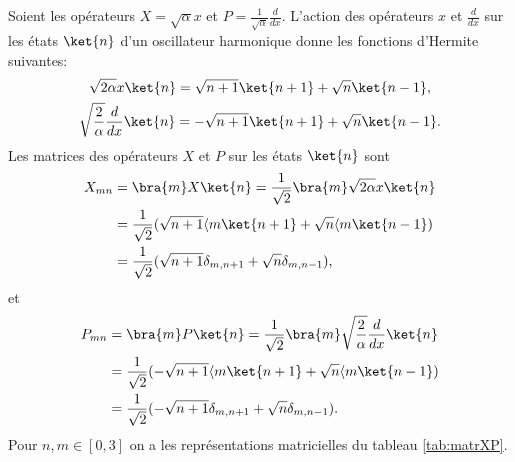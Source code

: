 \begin{example}
Soient les opérateurs $X=\sqrt{\alpha}x$ et $P=\frac{1}{\sqrt{\alpha}}\frac
{d}{dx}$. L'action des opérateurs $x$ et $\frac{d}{dx}$ sur les états
$\ket{n}$ d'un oscillateur harmonique donne les fonctions
d'Hermite suivantes:
\begin{subequations}%
\begin{gather}
\sqrt{2\alpha}x\ket{n}=\sqrt{n+1}\ket{n+1}+\sqrt{n}\ket{n-1},\\
\sqrt{\frac{2}{\alpha}}\frac{d}{dx}\ket{n}=-\sqrt{n+1}\ket{n+1}+\sqrt{n}\ket{n-1
}.
\end{gather}%
\end{subequations}%
Les matrices des opérateurs $X$ et $P$ sur les états $\ket{n}$ sont%
\begin{equation}
\begin{split}
X_{mn}  &  =\bra{m}X\ket{n}=\frac{1}{\sqrt{2}}\bra{m}\sqrt{2\alpha}x\ket{n}\\
&  =\frac{1}{\sqrt{2}}(\sqrt{n+1}\langle m\ket{n+1}+\sqrt{n}\langle m \ket{n-1})
\\
&=\frac{1}{\sqrt{2}}(\sqrt{n+1}\delta_{m,n+1}+\sqrt{n}\delta_{m,n-1}),
\end{split}
\end{equation}
et%
\begin{equation}
\begin{split}
P_{mn}  &  =\bra{m}P\ket{n}=\frac{1}{\sqrt{2}}\bra{m}\sqrt{\frac{2}{\alpha}}
\frac{d}{dx}\ket{n}\\
&  =\frac{1}{\sqrt{2}}(-\sqrt{n+1}\langle m\ket{n+1}+\sqrt{n}\langle m\ket{n-1})
\\
&
=\frac{1}{\sqrt{2}}(-\sqrt{n+1}\delta_{m,n+1}+\sqrt{n}\delta_{m,n-1}).
\end{split}
\end{equation}
Pour $n,m\in[0,3]$ on a les représentations matricielles du tableau
\ref{tab:matrXP}.%


\end{example}

